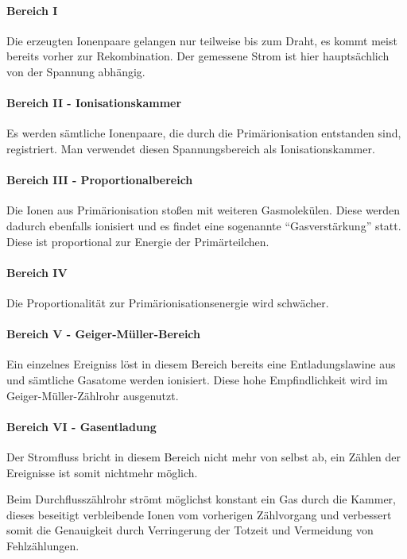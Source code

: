 \paragraph{Bereich I} Die erzeugten Ionenpaare gelangen nur teilweise bis zum Draht, es kommt meist bereits vorher zur Rekombination. Der gemessene Strom ist hier hauptsächlich von der Spannung abhängig.
\paragraph{Bereich II - Ionisationskammer} Es werden sämtliche Ionenpaare, die durch die Primärionisation entstanden sind, registriert. Man verwendet diesen Spannungsbereich als Ionisationskammer.
\paragraph{Bereich III - Proportionalbereich} Die Ionen aus Primärionisation stoßen mit weiteren Gasmolekülen. Diese werden dadurch ebenfalls ionisiert und es findet eine sogenannte "`Gasverstärkung"' statt. Diese ist proportional zur Energie der Primärteilchen.
\paragraph{Bereich IV} Die Proportionalität zur Primärionisationsenergie wird schwächer.
\paragraph{Bereich V - Geiger-Müller-Bereich} Ein einzelnes Ereigniss löst in diesem Bereich bereits eine Entladungslawine aus und sämtliche Gasatome werden ionisiert. Diese hohe Empfindlichkeit wird im Geiger-Müller-Zählrohr ausgenutzt. 
\paragraph{Bereich VI - Gasentladung} Der Stromfluss bricht in diesem Bereich nicht mehr von selbst ab, ein Zählen der Ereignisse ist somit nichtmehr möglich.

Beim Durchflusszählrohr strömt möglichst konstant ein Gas durch die Kammer, dieses beseitigt verbleibende Ionen vom vorherigen Zählvorgang und verbessert somit die Genauigkeit durch Verringerung der Totzeit und Vermeidung von Fehlzählungen.


